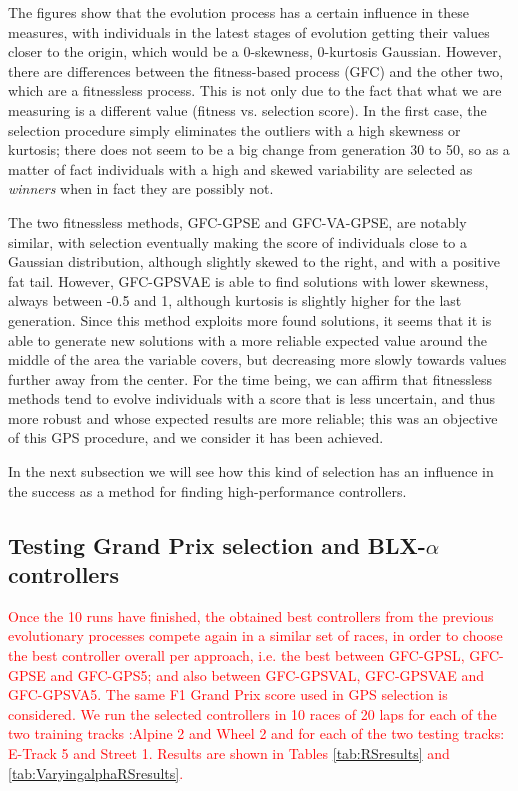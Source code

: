 \documentclass[10pt,journal,compsoc]{IEEEtran}
\begin{document}
The figures show that the evolution process has a certain influence in
these measures, with individuals in the latest stages of evolution
getting their values closer to the origin, which would be a 0-skewness, 0-kurtosis
Gaussian. However, there are differences between the fitness-based
process ({\sf GFC}) and the other two, which are a fitnessless process. This is not only due to the fact that what we are measuring is a different value (fitness vs. selection score). 
In the first case, the
selection procedure simply eliminates the outliers with a high
skewness or kurtosis; there does not seem to be a big change from
generation 30 to 50, so as a matter of fact individuals with a high
and skewed variability are selected as {\em winners} when in fact they
are possibly not.

The two fitnessless methods, {\sf GFC-GPSE} and {\sf GFC-VA-GPSE}, are
notably similar, with selection eventually making the score of  individuals
close to a Gaussian distribution, although slightly skewed to the
right, and with a positive fat tail. However, {\sf GFC-GPSVAE} is able
to find solutions with lower skewness, always between -0.5 and 1,
although kurtosis is slightly higher for the last generation. Since
this method exploits more found solutions, it seems that it is able to
generate new solutions with a more reliable expected value around the
middle of the area the variable covers, but decreasing more slowly
towards values further away from the center. For the time being,
we can affirm that fitnessless methods tend to evolve individuals
with a score that is less uncertain, and thus more robust and whose
expected results are more reliable; this was an objective of this GPS procedure, and we consider it has been achieved.

In the next subsection we will see how this kind of selection has an influence in the success as a method for finding high-performance controllers.



\subsection{Testing Grand Prix selection and BLX-$\alpha$ controllers}

\textcolor{red}{
Once the 10 runs have finished, the obtained best controllers from the
previous evolutionary processes compete again in a similar set of races, in order to choose the best controller overall per approach, i.e. the best between {\sf GFC-GPSL}, {\sf GFC-GPSE} and {\sf GFC-GPS5}; and also between {\sf GFC-GPSVAL}, {\sf GFC-GPSVAE} and {\sf GFC-GPSVA5}. The same F1 Grand Prix score used in GPS selection is considered. We run the selected controllers in 10 races of 20 laps for each of the two training tracks :Alpine 2  and Wheel 2  and  for each of the two testing tracks: E-Track 5 and Street 1. Results are shown in Tables \ref{tab:RSresults} and \ref{tab:VaryingalphaRSresults}.}
\end{document}
